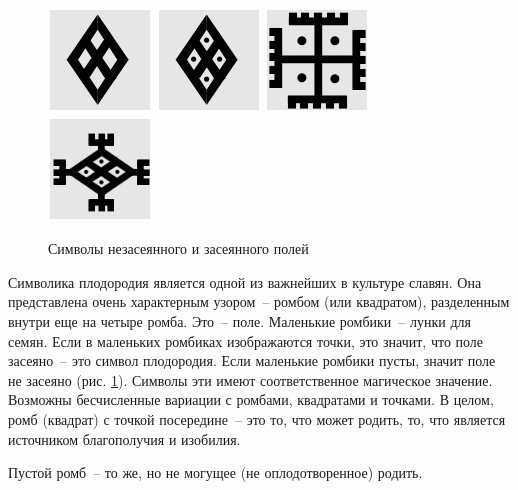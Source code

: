 \documentclass[pscyr,titlepage,chapters]{hedreport}
\begin{document}
  \begin{figure}[ht]
    \center
    \includegraphics{sl_5_1} \hspace{1em}
    \includegraphics{sl_5_2} \hspace{1em}
    \includegraphics{sl_5_3} \hspace{1em}
    \includegraphics{sl_5_4}
    \caption{Символы незасеянного и засеянного полей}
    \label{pic-fields}
  \end{figure}

  Символика плодородия является одной из важнейших в культуре славян.
  Она представлена очень характерным
  узором~-- ромбом (или квадратом), разделенным внутри еще на четыре ромба.
  Это~-- поле. Маленькие ромбики~-- лунки для семян. Если в
  маленьких ромбиках изображаются точки, это значит, что поле засеяно~-- это
  символ плодородия. Если маленькие ромбики пусты, значит поле не засеяно
  (рис. \ref{pic-fields}). Символы эти имеют соответственное магическое
  значение. Возможны бесчисленные
  вариации с ромбами, квадратами и точками. В целом, ромб (квадрат) с точкой
  посередине~-- это то, что может родить, то, что является источником
  благополучия и изобилия.

  Пустой ромб~-- то же, но не могущее (не оплодотворенное) родить.
 
\end{document}
